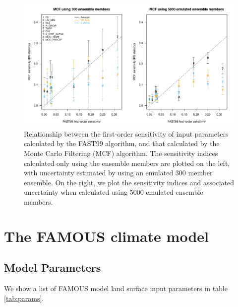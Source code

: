 \documentclass[gmd, manuscript]{copernicus} %
\begin{document}
\begin{figure}[t]
\includegraphics[width=12cm]{../graphics/figS07.pdf}
\caption{Relationship between the first-order sensitivity of input parameters calculated by the FAST99 algorithm, and that calculated by the Monte Carlo Filtering (MCF) algorithm. The sensitivity indices calculated only using the ensemble members are plotted on the left, with uncertainty estimated by using an emulated 300 member ensemble. On the right, we plot the sensitivity indices and associated uncertainty when calculated using 5000 emulated ensemble members.}
\label{fig:fast99_vs_mcf2}
\end{figure}

\section{The FAMOUS climate model}\label{ssec:famous_model}

\subsection{Model Parameters}\label{ssec:model_params}

We show a list of FAMOUS model land surface input parameters in table \ref{tab:params}.
\end{document}
